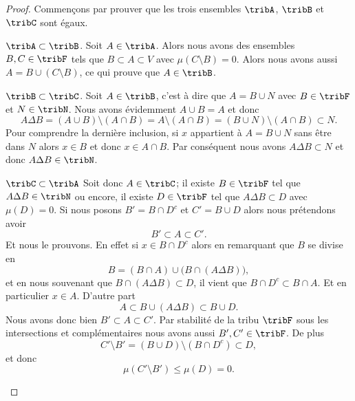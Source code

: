 \begin{proof}
    Commençons par prouver que les trois ensembles \( \tribA\), \( \tribB\) et \( \tribC\) sont égaux.
    \begin{subproof}
    \item[\( \tribA\subset\tribB\).]
        Soit \( A\in\tribA\). Alors nous avons des ensembles \( B,C\in\tribF \) tels que \( B\subset A\subset V\) avec \( \mu(C\setminus B)=0\). Alors nous avons aussi \( A=B\cup(C\setminus B)\), ce qui prouve que \( A\in\tribB\).
    \item[\( \tribB\subset\tribC\).]
        Soit \( A\in\tribB\), c'est à dire que \( A=B\cup N\) avec \( B\in\tribF\) et \( N\in\tribN\). Nous avons évidemment \( A\cup B=A\) et donc
        \begin{equation}
            A\Delta B=(A\cup B)\setminus(A\cap B)=A\setminus(A\cap B)=(B\cup N)\setminus(A\cap B)\subset N.
        \end{equation}
        Pour comprendre la dernière inclusion, si \( x\) appartient à \( A=B\cup N\) sans être dans \( N\) alors \( x\in B\) et donc \( x\in A\cap B\). Par conséquent nous avons \( A\Delta B\subset N\) et donc \( A\Delta B\in\tribN\).
    \item[\( \tribC\subset\tribA\)]
        Soit donc \( A\in\tribC\); il existe \( B\in\tribF\) tel que \( A\Delta B\in\tribN\) ou encore, il existe \( D\in\tribF\) tel que \( A\Delta B\subset D\) avec \( \mu(D)=0\). Si nous posons \( B'=B\cap D^c\) et \( C'=B\cup D\) alors nous prétendons avoir
        \begin{equation}
            B'\subset A\subset C'.
        \end{equation}
        Et nous le prouvons. En effet si \( x\in B\cap D^c\) alors en remarquant que \( B\) se divise en
        \begin{equation}
            B=(B\cap A)\cup\big(B\cap (A\Delta B)\big),
        \end{equation}
        et en nous souvenant que \( B\cap (A\Delta B)\subset D\), il vient que \( B\cap D^c\subset B\cap A\). Et en particulier \( x\in A\). D'autre part
        \begin{equation}
            A\subset B\cup(A\Delta B)\subset B\cup D.
        \end{equation}
        Nous avons donc bien \( B'\subset A\subset C'\). Par stabilité de la tribu \( \tribF\) sous les intersections et complémentaires nous avons aussi \( B',C'\in\tribF\). De plus
        \begin{equation}
            C'\setminus B'=(B\cup D)\setminus(B\cap D^c)\subset D,
        \end{equation}
         et donc
         \begin{equation}
             \mu(C'\setminus B')\leq \mu(D)=0.
         \end{equation}
    \end{subproof}


\end{proof}

